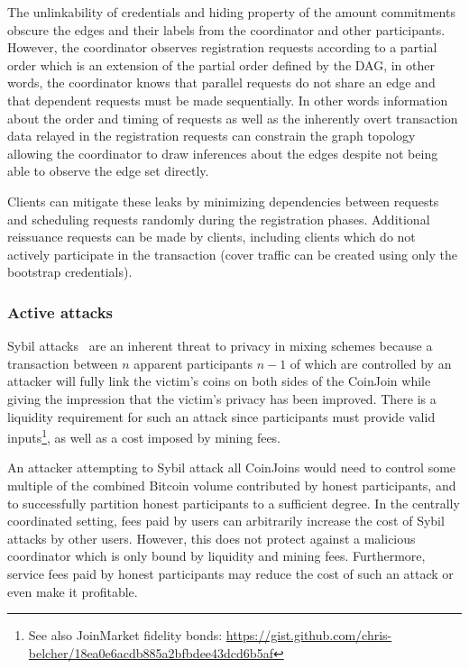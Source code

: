 \documentclass[a4paper]{article}
\begin{document}
The unlinkability of credentials and hiding property of the amount commitments obscure the edges and their labels from the coordinator and other participants. However, the coordinator observes registration requests according to a partial order which is an extension of the partial order defined by the DAG, in other words, the coordinator knows that parallel requests do not share an edge and that dependent requests must be made sequentially. In other words information about the order and timing of requests as well as the inherently overt transaction data relayed in the registration requests can constrain the graph topology allowing the coordinator to draw inferences about the edges despite not being able to observe the edge set directly.

Clients can mitigate these leaks by minimizing dependencies between requests and scheduling requests randomly during the registration phases. Additional reissuance requests can be made by clients, including clients which do not actively participate in the transaction (cover traffic can be created using only the bootstrap credentials).

\subsubsection{Active attacks}\label{sec:active}

Sybil attacks~\cite{douceur2002sybil} are an inherent threat to privacy in mixing schemes because a transaction between $n$ apparent participants $n-1$ of which are controlled by an attacker will fully link the victim's coins on both sides of the CoinJoin while giving the impression that the victim's privacy has been improved. There is a liquidity requirement for such an attack since participants must provide valid inputs\footnote{See also JoinMarket fidelity bonds: \url{https://gist.github.com/chris-belcher/18ea0e6acdb885a2bfbdee43dcd6b5af}}, as well as a cost imposed by mining fees.

An attacker attempting to Sybil attack all CoinJoins would need to control some multiple of the combined Bitcoin volume contributed by honest participants, and to successfully partition honest participants to a sufficient degree. In the centrally coordinated setting, fees paid by users can arbitrarily increase the cost of Sybil attacks by other users. However, this does not protect against a malicious coordinator which is only bound by liquidity and mining fees. Furthermore, service fees paid by honest participants may reduce the cost of such an attack or even make it profitable.
\end{document}
